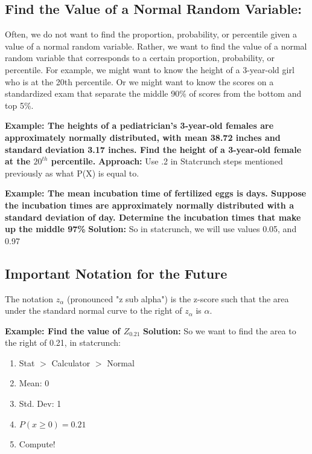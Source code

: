 \documentclass{report}
\begin{document}
    \bigbreak \noindent 
    \subsection*{Find the Value of a Normal Random Variable:}
    \bigbreak \noindent 
    Often, we do not want to find the proportion, probability, or percentile given a value of a normal random variable. Rather, we want to find the value of a normal random variable that corresponds to a certain proportion, probability, or percentile. For example, we might want to know the height of a 3-year-old girl who is at the 20th percentile. Or we might want to know the scores on a standardized exam that separate the middle 90\% of scores from the bottom and top 5\%.
    \bigbreak \noindent 
    \begin{mdframed}
        \textbf{Example: The heights of a pediatrician's 3-year-old females are approximately normally distributed, with mean 38.72 inches and standard deviation 3.17 inches. Find the height of a 3-year-old female at the $20^{th} $ percentile.}
        \bigbreak \noindent 
        \textbf{Approach:}
        \bigbreak \noindent 
        Use .2 in Statcrunch steps mentioned previously as what P(X) is equal to.
    \end{mdframed}
    \begin{mdframed}
        \textbf{Example: The mean incubation time of fertilized eggs is  days. Suppose the incubation times are approximately normally distributed with a standard deviation of  day. Determine the incubation times that make up the middle 97\%}
        \bigbreak \noindent 
        \textbf{Solution:}
        \bigbreak \noindent 
        So in statcrunch, we will use values 0.05, and 0.97
    \end{mdframed}


  \pagebreak 
  \subsection*{Important Notation for the Future}
  \bigbreak \noindent 
  The notation $z_{\alpha}$ (pronounced "z sub alpha") is the z-score such that the area under the standard normal curve to the right of $z_{\alpha}$ is $\alpha$. 
  \bigbreak \noindent 
  \begin{mdframed}
    \textbf{Example: Find the value of $Z_{0.21} $}
    \bigbreak \noindent 
    \textbf{Solution:}
    So we want to find the area to the right of 0.21, in statcrunch:
    \begin{enumerate}
      \item Stat $> $ Calculator $> $ Normal
      \item Mean: 0 
      \item Std. Dev: 1
      \item $P(x \geq 0) = 0.21$
      \item Compute!
    \end{enumerate}
  \end{mdframed}
\end{document}
